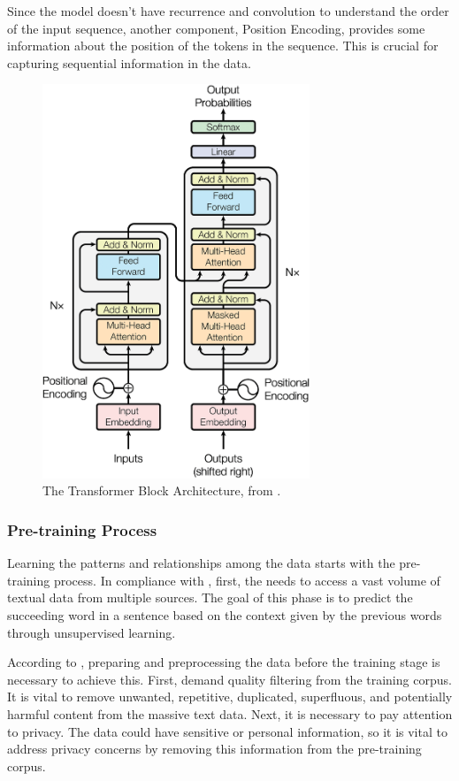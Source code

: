 Since the model doesn't have recurrence and convolution to understand the order of the input sequence, another component, Position Encoding, provides some information about the position of the tokens in the sequence. This is crucial for capturing sequential information in the data. 

\begin{figure}[ht]
    \includegraphics[width=8cm]{figs/chapter2/transformer.png}
    \centering
    \caption{The Transformer Block Architecture, from \citet{vaswani_attention_2023}.}
    \label{fig_trans_arch}
\end{figure}


\subsubsection{Pre-training Process}

Learning the patterns and relationships among the data starts with the pre-training process. In compliance with \citet{min_recent_pretrained}, first, the {\llm} needs to access a vast volume of textual data from multiple sources. The goal of this phase is to predict the succeeding word in a sentence based on the context given by the previous words through unsupervised learning. 

According to \citet{hadi_LLM_2023}, preparing and preprocessing the data before the training stage is necessary to achieve this. First, demand quality filtering from the training corpus. It is vital to remove unwanted, repetitive, duplicated, superfluous, and potentially harmful content from the massive text data. Next, it is necessary to pay attention to privacy. The data could have sensitive or personal information, so it is vital to address privacy concerns by removing this information from the pre-training corpus.

